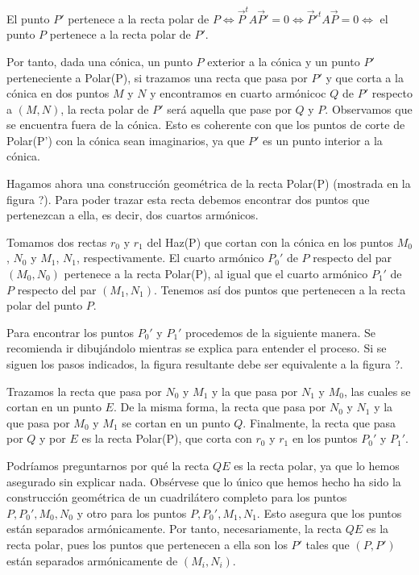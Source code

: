 \begin{obs}
	 El punto $P'$ pertenece a la recta polar de $P\Leftrightarrow  \vec{P}^tA\vec{P}'=0\Leftrightarrow \vec{P}'^tA\vec{P}=0\Leftrightarrow $ el punto $P$ pertenece a la recta polar de $P'$.
\end{obs}

Por tanto, dada una cónica, un punto $P$ exterior a la cónica y un punto $P'$ perteneciente a Polar(P), si trazamos una recta que pasa por $P'$ y que corta a la cónica en dos puntos $M$ y $N$ y encontramos en cuarto armónicoc $Q$ de $P'$ respecto a $(M,N)$, la recta polar de $P'$ será aquella que pase por $Q$ y $P$. Observamos que se encuentra fuera de la cónica. Esto es coherente con que los puntos de corte de Polar(P') con la cónica sean imaginarios, ya que $P'$ es un punto interior a la cónica.

Hagamos ahora una construcción geométrica de la recta Polar(P) (mostrada en la figura ?). Para poder trazar esta recta debemos encontrar dos puntos que pertenezcan a ella, es decir, dos cuartos armónicos.

Tomamos dos rectas $r_0$ y $r_1$ del Haz(P) que cortan con la cónica en los puntos $M_0$, $N_0$ y $M_1$, $N_1$, respectivamente. El cuarto armónico $P_0'$ de $P$ respecto del par $(M_0,N_0)$ pertenece a la recta Polar(P), al igual que el cuarto armónico $P_1'$ de $P$ respecto del par $(M_1,N_1)$. Tenemos así dos puntos que pertenecen a la recta polar del punto $P$.

Para encontrar los puntos $P_0'$ y $P_1'$ procedemos de la siguiente manera. Se recomienda ir dibujándolo mientras se explica para entender el proceso. Si se siguen los pasos indicados, la figura resultante debe ser equivalente a la figura ?.

Trazamos la recta que pasa por $N_0$ y $M_1$ y la que pasa por $N_1$ y $M_0$, las cuales se cortan en un punto $E$. De la misma forma, la recta que pasa por $N_0$ y $N_1$ y la que pasa por $M_0$ y $M_1$ se cortan en un punto $Q$. Finalmente, la recta que pasa por $Q$ y por $E$ es la recta Polar(P), que corta con $r_0$ y $r_1$ en los puntos $P_0'$ y $P_1'$.

Podríamos preguntarnos por qué la recta $QE$ es la recta polar, ya que lo hemos asegurado sin explicar nada. Obsérvese que lo único que hemos hecho ha sido la construcción geométrica de un cuadrilátero completo para los puntos $P,P_0',M_0,N_0$ y otro para los puntos $P,P_0',M_1,N_1$. Esto asegura que los puntos están separados armónicamente. Por tanto, necesariamente, la recta $QE$ es la recta polar, pues los puntos que pertenecen a ella son los $P'$ tales que $(P,P')$ están separados armónicamente de $(M_i,N_i)$.

